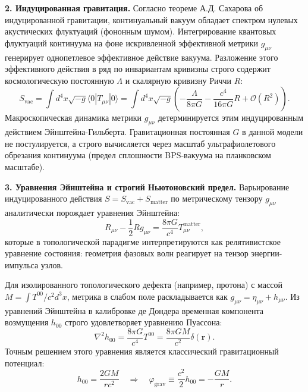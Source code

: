 \documentclass[11pt,a4paper]{article}
\begin{document}
	\textbf{2. Индуцированная гравитация.}
	Согласно теореме А.Д. Сахарова об индуцированной гравитации, континуальный вакуум обладает спектром нулевых акустических флуктуаций (фононным шумом). Интегрирование квантовых флуктуаций континуума на фоне искривленной эффективной метрики $g_{\mu\nu}$ генерирует однопетлевое эффективное действие вакуума. 
	Разложение этого эффективного действия в ряд по инвариантам кривизны строго содержит космологическую постоянную $\Lambda$ и скалярную кривизну Риччи $R$:
	\begin{equation}
		S_{\text{vac}} = \int d^4x \sqrt{-g} \langle 0 | T_{\mu\nu} | 0 \rangle = \int d^4x \sqrt{-g} \left( - \frac{\Lambda}{8\pi G} - \frac{c^4}{16\pi G} R + \mathcal{O}(R^2) \right).
	\end{equation}
	Макроскопическая динамика метрики $g_{\mu\nu}$ детерминируется этим индуцированным действием Эйнштейна-Гильберта. Гравитационная постоянная $G$ в данной модели не постулируется, а строго вычисляется через масштаб ультрафиолетового обрезания континуума (предел сплошности BPS-вакуума на планковском масштабе).
	
	\textbf{3. Уравнения Эйнштейна и строгий Ньютоновский предел.}
	Варьирование индуцированного действия $S = S_{\text{vac}} + S_{\text{matter}}$ по метрическому тензору $g_{\mu\nu}$ аналитически порождает уравнения Эйнштейна:
	\begin{equation}
		R_{\mu\nu} - \frac{1}{2}R g_{\mu\nu} = \frac{8\pi G}{c^4} T_{\mu\nu}^{\text{matter}},
	\end{equation}
	которые в топологической парадигме интерпретируются как релятивистское уравнение состояния: геометрия фазовых волн реагирует на тензор энергии-импульса узлов.
	
	Для изолированного топологического дефекта (например, протона) с массой $M = \int T^{00}/c^2 d^3x$, метрика в слабом поле раскладывается как $g_{\mu\nu} = \eta_{\mu\nu} + h_{\mu\nu}$. Из уравнений Эйнштейна в калибровке де Дондера временная компонента возмущения $h_{00}$ строго удовлетворяет уравнению Пуассона:
	\begin{equation}
		\nabla^2 h_{00} = \frac{8\pi G}{c^4} T^{00} = \frac{8\pi G M}{c^2} \delta(\mathbf{r}).
	\end{equation}
	Точным решением этого уравнения является классический гравитационный потенциал:
	\begin{equation}
		h_{00} = \frac{2 G M}{r c^2} \quad \Longrightarrow \quad \varphi_{\text{grav}} \equiv \frac{c^2}{2} h_{00} = - \frac{GM}{r}.
	\end{equation}
	
\end{document}
